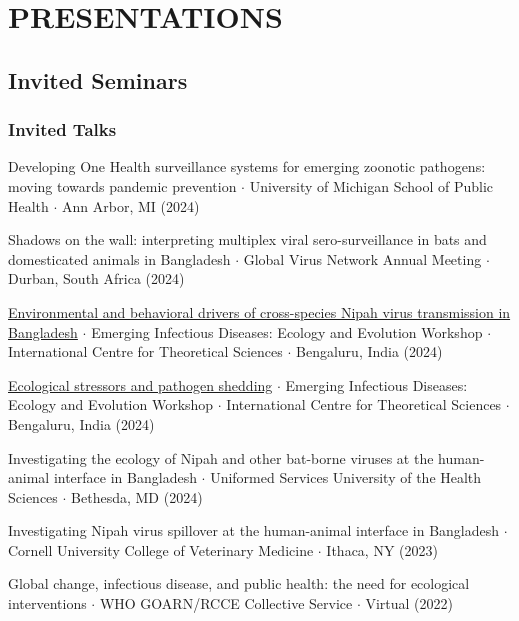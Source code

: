 \documentclass{cv}
\begin{document}

\section*{PRESENTATIONS}

\subsection*{Invited Seminars}

\subsubsection*{Invited Talks}

Developing One Health surveillance systems for emerging zoonotic pathogens: moving towards pandemic prevention $\cdot$ University of Michigan School of Public Health $\cdot$ Ann Arbor, MI (2024)

Shadows on the wall: interpreting multiplex viral sero-surveillance in bats and domesticated animals in Bangladesh $\cdot$ Global Virus Network Annual Meeting $\cdot$ Durban, South Africa (2024)

\href{https://www.youtube.com/live/MOgTl1EUSes?si=iMqpRzL8OlzRsdlE}{Environmental and behavioral drivers of cross-species Nipah virus transmission in Bangladesh} $\cdot$ 
Emerging Infectious Diseases: Ecology and Evolution Workshop $\cdot$ International Centre for Theoretical Sciences $\cdot$ Bengaluru, India (2024)

\href{https://www.youtube.com/live/WlhZYbyfGiw?si=1AW1gtXbbL0bbaPp}{Ecological stressors and pathogen shedding} $\cdot$ Emerging Infectious Diseases: Ecology and Evolution Workshop $\cdot$ International Centre for Theoretical Sciences $\cdot$ Bengaluru, India (2024)

Investigating the ecology of Nipah and other bat-borne viruses at the human-animal interface in Bangladesh $\cdot$ Uniformed Services University of the Health Sciences $\cdot$ Bethesda, MD (2024)

Investigating Nipah virus spillover at the human-animal interface in Bangladesh $\cdot$ Cornell University College of Veterinary Medicine $\cdot$ Ithaca, NY (2023)

Global change, infectious disease, and public health: the need for ecological interventions $\cdot$ WHO GOARN/RCCE Collective Service $\cdot$ Virtual (2022)
\end{document}
